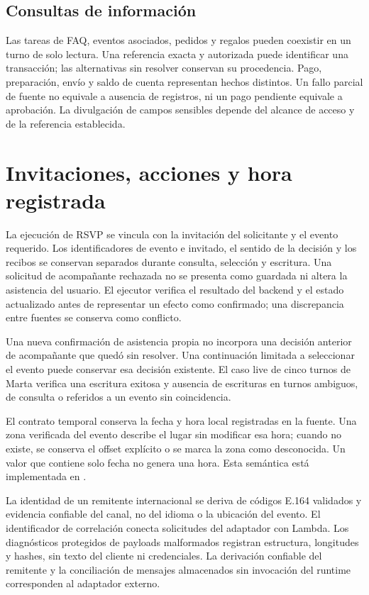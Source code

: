 \documentclass[
	a4paper,
	12pt,
]{CSSullivanBusinessReport}
\begin{document}
\subsection{Consultas de información}
Las tareas de FAQ, eventos asociados, pedidos y regalos pueden coexistir en un turno de solo lectura. Una referencia exacta y autorizada puede identificar una transacción; las alternativas sin resolver conservan su procedencia. Pago, preparación, envío y saldo de cuenta representan hechos distintos. Un fallo parcial de fuente no equivale a ausencia de registros, ni un pago pendiente equivale a aprobación. La divulgación de campos sensibles depende del alcance de acceso y de la referencia establecida.

\section{Invitaciones, acciones y hora registrada}
La ejecución de RSVP se vincula con la invitación del solicitante y el evento requerido. Los identificadores de evento e invitado, el sentido de la decisión y los recibos se conservan separados durante consulta, selección y escritura. Una solicitud de acompañante rechazada no se presenta como guardada ni altera la asistencia del usuario. El ejecutor verifica el resultado del backend y el estado actualizado antes de representar un efecto como confirmado; una discrepancia entre fuentes se conserva como conflicto.

Una nueva confirmación de asistencia propia no incorpora una decisión anterior de acompañante que quedó sin resolver. Una continuación limitada a seleccionar el evento puede conservar esa decisión existente. El caso live de cinco turnos de Marta verifica una escritura exitosa y ausencia de escrituras en turnos ambiguos, de consulta o referidos a un evento sin coincidencia.

El contrato temporal conserva la fecha y hora local registradas en la fuente. Una zona verificada del evento describe el lugar sin modificar esa hora; cuando no existe, se conserva el offset explícito o se marca la zona como desconocida. Un valor que contiene solo fecha no genera una hora. Esta semántica está implementada en .

La identidad de un remitente internacional se deriva de códigos E.164 validados y evidencia confiable del canal, no del idioma o la ubicación del evento. El identificador de correlación conecta solicitudes del adaptador con Lambda. Los diagnósticos protegidos de payloads malformados registran estructura, longitudes y hashes, sin texto del cliente ni credenciales. La derivación confiable del remitente y la conciliación de mensajes almacenados sin invocación del runtime corresponden al adaptador externo.
\end{document}
